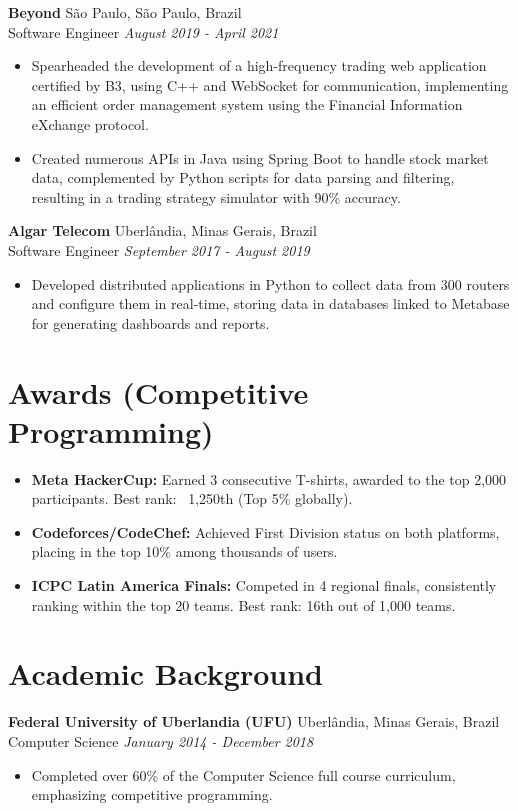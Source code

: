 \documentclass[a4paper,10pt]{article}
\begin{document}
\textbf{Beyond} \hfill São Paulo, São Paulo, Brazil \\
Software Engineer \hfill \textit{August 2019 - April 2021}
\begin{itemize}
    \item Spearheaded the development of a high-frequency trading web application certified by B3, using C++ and WebSocket for communication, implementing an efficient order management system using the Financial Information eXchange protocol.
    \item Created numerous APIs in Java using Spring Boot to handle stock market data, complemented by Python scripts for data parsing and filtering, resulting in a trading strategy simulator with 90\% accuracy.
\end{itemize}

\textbf{Algar Telecom} \hfill Uberlândia, Minas Gerais, Brazil \\
Software Engineer \hfill \textit{September 2017 - August 2019}
\begin{itemize}
    \item Developed distributed applications in Python to collect data from 300 routers and configure them in real-time, storing data in databases linked to Metabase for generating dashboards and reports.
\end{itemize}

\section*{Awards (Competitive Programming)}
\begin{itemize}
    \item \textbf{Meta HackerCup:} Earned 3 consecutive T-shirts, awarded to the top 2,000 participants. Best rank: ~1,250th (Top 5\% globally).
    \item \textbf{Codeforces/CodeChef:} Achieved First Division status on both platforms, placing in the top 10\% among thousands of users.
    \item \textbf{ICPC Latin America Finals:} Competed in 4 regional finals, consistently ranking within the top 20 teams. Best rank: 16th out of 1,000 teams.
\end{itemize}

\section*{Academic Background}

\textbf{Federal University of Uberlandia (UFU)} \hfill Uberlândia, Minas Gerais, Brazil \\
Computer Science \hfill \textit{January 2014 - December 2018}
\begin{itemize}
    \item Completed over 60\% of the Computer Science full course curriculum, emphasizing competitive programming.
\end{itemize}
\end{document}
